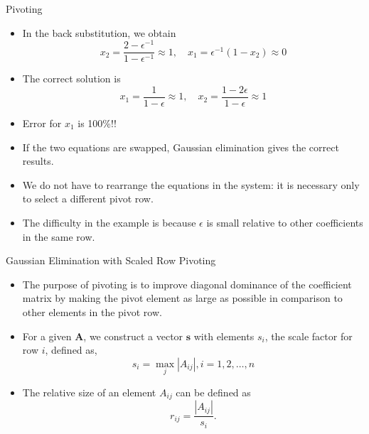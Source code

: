 \documentclass{beamer}
\newcommand{\beforeverb}{\footnotesize}
\newcommand{\afterverb}{\normalsize}
\begin{document}
\begin{frame}{Pivoting}
\begin{itemize}
\item In the back substitution, we obtain
\beforeverb
\[
x_2=\frac{2-\epsilon ^{-1}}{1-\epsilon ^{-1}}\approx 1, \quad x_1=\epsilon ^{-1}(1-x_2)\approx 0
\]
\afterverb
\item The correct solution is 
\beforeverb
\[
x_1=\frac{1}{1-\epsilon}\approx 1, \quad x_2=\frac{1-2\epsilon}{1-\epsilon}\approx 1
\]
\afterverb
\item Error for $x_1$ is 100\%!!
\item If the two equations are swapped, Gaussian elimination gives the correct results.
\item We do not have to rearrange the equations in the system: it is necessary only to select a \alert{different pivot row}. 
\item The difficulty in the example is because $\epsilon$ is small relative to other coefficients in the same row.
\end{itemize}
\end{frame}
\begin{frame}{Gaussian Elimination with Scaled Row Pivoting}
\begin{itemize}
\item The purpose of pivoting is to improve \alert{diagonal dominance} of the coefficient matrix by making the \alert{pivot element} as \alert{large} as possible in comparison to other elements in the pivot row.
\item For a given $\mathbf{A}$, we construct a vector $\mathbf{s}$ with elements $s_i$, the \alert{scale factor for row $i$}, defined as, 
\beforeverb
\[
s_i=\max_{j}|A_{ij}|, i=1,2,\ldots,n
\]
\afterverb
\item The relative size of an element $A_{ij}$ can be defined as 
\beforeverb
\[
r_{ij}=\frac{|A_{ij}|}{s_i}.
\]
\afterverb
\end{itemize}
\end{frame}
\end{document}
